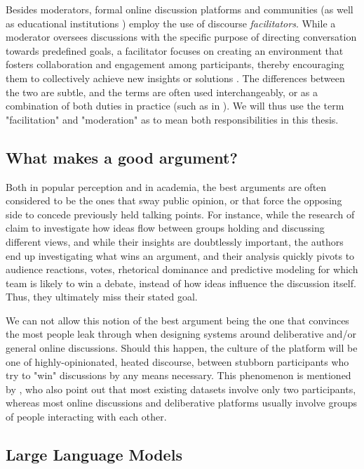 Besides moderators, formal online discussion platforms and communities (as well as educational institutions \cite{Wang2008StudentfacilitatorsRI, Zhong2019ExploringTR}) employ the use of discourse \textit{facilitators}. While a moderator oversees discussions with the specific purpose of directing conversation towards predefined goals, a facilitator focuses on creating an environment that fosters collaboration and engagement among participants, thereby encouraging them to collectively achieve new insights or solutions \cite{wef_moderation}. The differences between the two are subtle, and the terms are often used interchangeably, or as a combination of both duties in practice (such as in \citet{Zhong2019ExploringTR, Carson2008}). We will thus use the term "facilitation" and "moderation" as to mean both responsibilities in this thesis. 

\subsection{What makes a good argument?}
\label{sec:background:good-argument}

Both in popular perception and in academia, the best arguments are often considered to be the ones that sway public opinion, or that force the opposing side to concede previously held talking points. For instance, while the research of \citet{zhang2016-oxford} claim to investigate how ideas flow between groups holding and discussing different views, and while their insights are doubtlessly important, the authors end up investigating what wins an argument, and their analysis quickly pivots to audience reactions, votes, rhetorical dominance and predictive modeling for which team is likely to win a debate, instead of how ideas influence the discussion itself. Thus, they ultimately miss their stated goal.

We can not allow this notion of the best argument being the one that convinces the most people leak through when designing systems around deliberative and/or general online discussions. Should this happen, the culture of the platform will be one of highly-opinionated, heated discourse, between stubborn participants who try to "win" discussions by any means necessary. This phenomenon is mentioned by \citet{karadzhov2023delidata}, who also point out that most existing datasets involve only two participants, whereas most online discussions and deliberative platforms usually involve groups of people interacting with each other. 


\subsection{Large Language Models}
\label{sec:background:llm}

